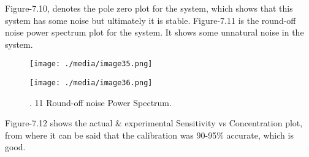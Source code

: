 \begin{enumerate}

\par

\par


\vspace{\baselineskip}
\begin{justify}
Figure-7.10, denotes the pole zero plot for the system, which shows that this system has some noise but ultimately it is stable. Figure-7.11 is the round-off noise power spectrum plot for the system. It shows some unnatural noise in the system.
\end{justify}\par




\begin{figure}[H]
	\begin{Center}
		\texttt{[image: ./media/image35.png]}
	\end{Center}
\end{figure}



\par

\par


\vspace{\baselineskip}



\begin{figure}[H]
	\begin{Center}
		\texttt{[image: ./media/image36.png]}
		\caption{. 11 Round-off noise Power Spectrum.}
		\label{fig:_11_Roundoff_noise_Power_Spectrum}
	\end{Center}
\end{figure}



\par

\par

\begin{justify}
Figure-7.12 shows the actual $\&$  experimental Sensitivity vs Concentration plot, from where it can be said that the calibration was 90-95$\%$  accurate, which is good.
\end{justify}\par



\end{enumerate}
